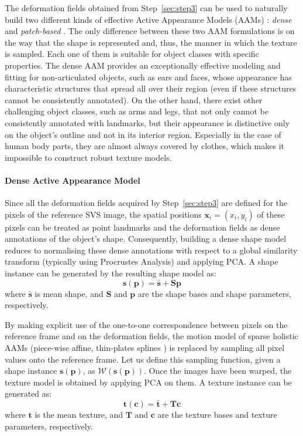 The deformation fields obtained from Step~\ref{sec:step3} can be used to naturally build two different kinds of effective Active Appearance Models (AAMs) \cite{Cootes2001, Matthews2004}: \emph{dense} \cite{ramnath2008increasing, Amberg2009, anderson2014using} and \emph{patch-based} \cite{Tzimiropoulos2014}. The only difference between these two AAM formulations is on the way that the shape is represented and, thus, the manner in which the texture is sampled. Each one of them is suitable for object classes with specific properties. The dense AAM provides an exceptionally effective modeling and fitting for non-articulated objects, such as ears and faces, whose appearance has characteristic structures that spread all over their region (even if these structures cannot be consistently annotated). On the other hand, there exist other challenging object classes, such as arms and legs, that not only cannot be consistently annotated with landmarks, but their appearance is distinctive only on the object's outline and not in its interior region. Especially in the case of human body parts, they are almost always covered by clothes, which makes it impossible to construct robust texture models.

\paragraph{Dense Active Appearance Model} Since all the deformation fields acquired by Step~\ref{sec:step3} are defined for the pixels of the reference SVS image, the spatial positions $\bm{x}_i=(x_i, y_i)$ of these pixels can be treated as point landmarks and the deformation fields as dense annotations of the object's shape. Consequently, building a dense shape model reduces to normalising these dense annotations with respect to a global similarity transform (typically using Procrustes Analysis) and applying PCA. A shape instance can be generated by the resulting shape model as:
\begin{equation}
    \bm{s}(\bm{p}) = \bm{\bar{s}} + \bm{S} \bm{p}
    \label{eq:shape_model}
\end{equation}
where $\bm{\bar{s}}$ is mean shape, and $\bm{S}$ and $\bm{p}$ are the shape bases and shape parameters, respectively.

By making explicit use of the one-to-one correspondence between pixels on the reference frame and on the deformation fields, the motion model of sparse holistic AAMs \cite{Cootes2001, Matthews2004} (piece-wise affine, thin-plates splines \cite{Bookstein1989}) is replaced by sampling all pixel values onto the reference frame. Let us define this sampling function, given a shape instance $\bm{s}(\bm{p})$, as $\mathcal{W}(\bm{s}(\bm{p}))$. Once the images have been warped, the texture model is obtained by applying PCA on them. A texture instance can be generated as:
\begin{equation}
    \bm{t}(\bm{c}) = \bm{\bar{t}} + \bm{T} \bm{c}
	\label{eq:tex_model}
\end{equation}
where $\bm{t}$ is the mean texture, and $\bm{T}$ and $\bm{c}$ are the texture bases and texture parameters, respectively.

